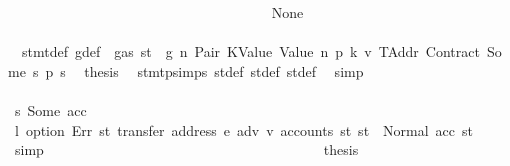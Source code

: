 \begin{isabellebody}
\ \ \ \ \ \ \ \ \ \ \ \ \ \ \ \ \ \ \ \ \ \ \ \ \ \ \ \ \ \ \ \ \ \ \ \ \isamarkupfalse%
\ None\isanewline
\ \ \ \ \ \ \ \ \ \ \ \ \ \ \ \ \ \ \ \ \ \ \ \ \ \ \ \ \ \ \ \ \ \ \ \ \isamarkupfalse%
\ {}{\isacharparenleft}{\kern0pt}{}{\isacharparenright}{\kern0pt}\ stmt{\isacharunderscore}{\kern0pt}def\ g{\isacharunderscore}{\kern0pt}def\ {\isacharbackquoteopen}{\isasymnot}\ gas\ st\ {\isasymle}\ g{\isacharbackquoteclose}\ n\ Pair\ KValue\ Value\ n{}\ p{}\ k{}\ v{}\ TAddr\ Contract\ Some\ s{}\ p{}\ s{}\ \isamarkupfalse%
\ {\isacharquery}{\kern0pt}thesis\ \isamarkupfalse%
\ stmt{\isachardot}{\kern0pt}psimps{\isacharparenleft}{\kern0pt}{}{\isacharparenright}{\kern0pt}\ st{\isacharprime}{\kern0pt}{\isacharunderscore}{\kern0pt}def\ st{\isacharprime}{\kern0pt}{\isacharprime}{\kern0pt}{\isacharunderscore}{\kern0pt}def\ st{\isacharprime}{\kern0pt}{\isacharprime}{\kern0pt}{\isacharprime}{\kern0pt}{\isacharunderscore}{\kern0pt}def\ \isamarkupfalse%
\ simp\isanewline
\ \ \ \ \ \ \ \ \ \ \ \ \ \ \ \ \ \ \ \ \ \ \ \ \ \ \ \ \ \ \ \ \ \ \isamarkupfalse%
\isanewline
\ \ \ \ \ \ \ \ \ \ \ \ \ \ \ \ \ \ \ \ \ \ \ \ \ \ \ \ \ \ \ \ \ \ \ \ \isamarkupfalse%
\ s{}{\isacharcolon}{\kern0pt}\ {\isacharparenleft}{\kern0pt}Some\ acc{\isacharparenright}{\kern0pt}\isanewline
\ \ \ \ \ \ \ \ \ \ \ \ \ \ \ \ \ \ \ \ \ \ \ \ \ \ \ \ \ \ \ \ \ \ \ \ \isamarkupfalse%
\ \isamarkupfalse%
\ l{}{\isacharcolon}{\kern0pt}\ {\isachardoublequoteopen}option\ Err\ {\isacharparenleft}{\kern0pt}{\isasymlambda}st{\isachardot}{\kern0pt}\ transfer\ {\isacharparenleft}{\kern0pt}address\ e{\isacharparenright}{\kern0pt}\ adv\ v{\isacharprime}{\kern0pt}\ {\isacharparenleft}{\kern0pt}accounts\ st{\isacharparenright}{\kern0pt}{\isacharparenright}{\kern0pt}\ st{\isacharprime}{\kern0pt}{\isacharprime}{\kern0pt}{\isacharprime}{\kern0pt}\ {\isacharequal}{\kern0pt}\ Normal\ {\isacharparenleft}{\kern0pt}acc{\isacharcomma}{\kern0pt}\ st{\isacharprime}{\kern0pt}{\isacharprime}{\kern0pt}{\isacharprime}{\kern0pt}{\isacharparenright}{\kern0pt}{\isachardoublequoteclose}\ \isamarkupfalse%
\ simp\isanewline
\ \ \ \ \ \ \ \ \ \ \ \ \ \ \ \ \ \ \ \ \ \ \ \ \ \ \ \ \ \ \ \ \ \ \ \ \isamarkupfalse%
\ \isamarkupfalse%
\ {\isacharquery}{\kern0pt}thesis\isanewline
\ \ \ \ \ \ \ \ \ \ \ \ \ \ \ \ \ \ \ \ \ \ \ \ \ \ \ \ \ \ \ \ \ \ \ \ \isamarkupfalse%

\end{isabellebody}
